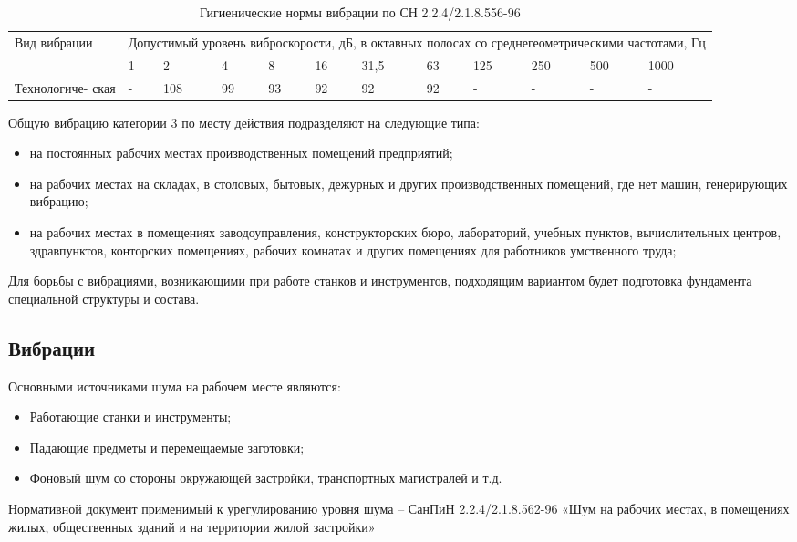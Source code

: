 \begin{table}[!h]
	\begin{center}
		\caption{Гигиенические нормы вибрации по СН 2.2.4/2.1.8.556-96}
		\begin{tabular}{|p{30mm}|
			p{7mm}|
			p{7mm}|
			p{7mm}|
			p{7mm}|
			p{7mm}|
			p{7mm}|
			p{7mm}|
			p{7mm}|
			p{7mm}|
			p{7mm}|
			p{10mm}|
		}
	\hline
	Вид вибрации & \multicolumn{11}{|p{110mm}|}{Допустимый уровень виброскорости, дБ, в октавных полосах со среднегеометрическими частотами, Гц} \\ 
	\cline {2-12}
	& 1 & 2 & 4 & 8 & 16 & 31,5 & 63 & 125 & 250 & 500 & 1000 \\
	\hline
	Технологиче- ская & - & 108 & 99 & 93 & 92 & 92 & 92 & - & - & - & - \\
	\hline
		\end{tabular}
		\label{tab:eco_ion}
	\end{center}
\end{table}

Общую вибрацию категории 3 по месту действия подразделяют на следующие типа:
\begin{itemize}
	\item на постоянных рабочих местах производственных помещений предприятий;
	\item на рабочих местах на складах, в столовых, бытовых, дежурных и других производственных помещений, где нет машин, генерирующих вибрацию;
	\item на рабочих местах в помещениях заводоуправления, конструкторских бюро, лабораторий, учебных пунктов, вычислительных центров, здравпунктов, конторских помещениях, рабочих комнатах и других помещениях для работников умственного труда;
\end{itemize}

Для борьбы с вибрациями, возникающими при работе станков и инструментов, подходящим вариантом будет подготовка фундамента специальной структуры и состава.

\subsection{Вибрации}
Основными источниками шума на рабочем месте являются:
\begin{itemize}
	\item Работающие станки и инструменты;
	\item Падающие предметы и перемещаемые заготовки;
	\item Фоновый шум со стороны окружающей застройки, транспортных магистралей и т.д.
\end{itemize}

Нормативной документ применимый к урегулированию уровня шума – СанПиН 2.2.4/2.1.8.562-96 «Шум на рабочих местах, в помещениях жилых, общественных зданий и на территории жилой застройки»
